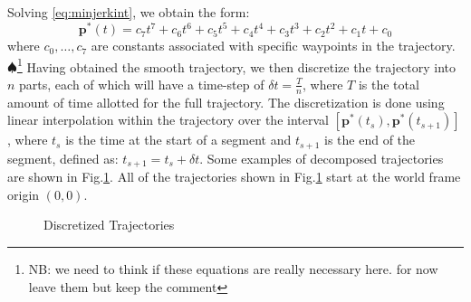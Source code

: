 \documentclass[letterpaper, 10 pt, conference]{ieeeconf}  %
\newcommand\NB[1]{$\spadesuit$\footnote{NB: #1}}
\begin{document}
Solving \eqref{eq:minjerkint}, we obtain the form:
\begin{equation}
    \mathbf{p}^*(t) = c_7t^7 + c_6t^6 + c_5t^5 + c_4t^4 + c_3t^3 + c_2t^2 + c_1t + c_0 
\end{equation}
where $c_0,\ldots,c_7$ are constants associated with specific waypoints in the trajectory.
\NB{we need to think if these equations are really necessary here. for now leave them but keep the comment}
Having obtained the smooth trajectory, we then discretize the trajectory into $n$ parts, each of which will have a time-step of $\delta t = \frac{T}{n}$, where $T$ is the total amount of time allotted for the full trajectory. The discretization is done using linear interpolation within the trajectory over the interval $[\mathbf{p}^*(t_s), \mathbf{p}^*(t_{s+1})]$, where $t_s$ is the time at the start of a segment and $t_{s+1}$ is the end of the segment, defined as: $t_{s+1} = t_s + \delta t$. 
Some examples of decomposed trajectories are shown in Fig.\ref{fig:trajs}. All of the trajectories shown in Fig.\ref{fig:trajs} start at the world frame origin $(0,0)$.

\begin{figure}[h]
	\centering
	\caption{Discretized Trajectories}
	\label{fig:trajs}
\end{figure}
\end{document}
